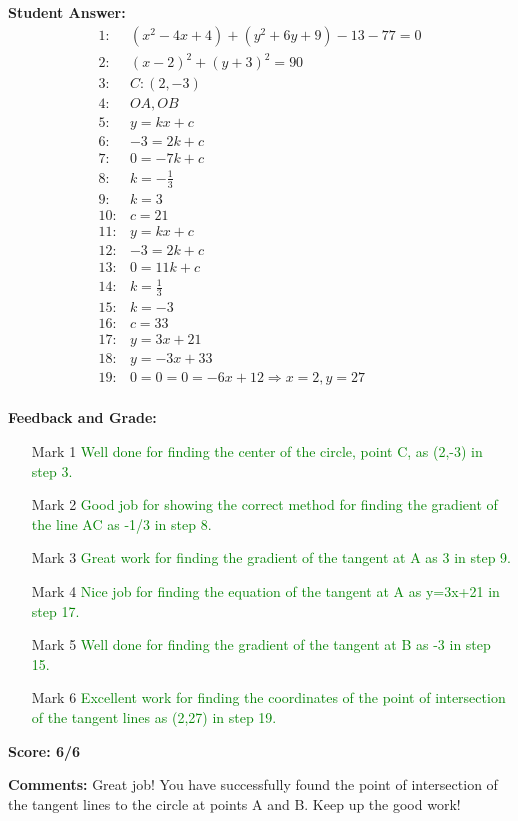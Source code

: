 \documentclass{article}
\begin{document}
\textbf{Student Answer:}
\begin{align*}
1: & (x^{2}-4x+4)+(y^{2}+6y+9)-13-77=0 \\
2: & (x-2)^{2}+(y+3)^{2}=90 \\
3: & C: (2, -3) \\
4: & OA, OB \\
5: & y=kx+c \\
6: & -3=2k+c \\
7: & 0=-7k+c \\
8: & k=-\frac{1}{3} \\
9: & k=3 \\
10: & c=21 \\
11: & y=kx+c \\
12: & -3=2k+c \\
13: & 0=11k+c \\
14: & k=\frac{1}{3} \\
15: & k=-3 \\
16: & c=33 \\
17: & y=3x+21 \\
18: & y=-3x+33 \\
19: & 0=0=0=-6x+12 \Rightarrow x=2,y=27 \\
\end{align*}

\textbf{Feedback and Grade:}
\begin{itemize}
\item[Mark 1] \textcolor{green}{Well done for finding the center of the circle, point C, as (2,-3) in step 3.}
\item[Mark 2] \textcolor{green}{Good job for showing the correct method for finding the gradient of the line AC as -1/3 in step 8.}
\item[Mark 3] \textcolor{green}{Great work for finding the gradient of the tangent at A as 3 in step 9.}
\item[Mark 4] \textcolor{green}{Nice job for finding the equation of the tangent at A as y=3x+21 in step 17.}
\item[Mark 5] \textcolor{green}{Well done for finding the gradient of the tangent at B as -3 in step 15.}
\item[Mark 6] \textcolor{green}{Excellent work for finding the coordinates of the point of intersection of the tangent lines as (2,27) in step 19.}
\end{itemize}

\textbf{Score: 6/6}

\textbf{Comments:} Great job! You have successfully found the point of intersection of the tangent lines to the circle at points A and B. Keep up the good work!
\end{document}
